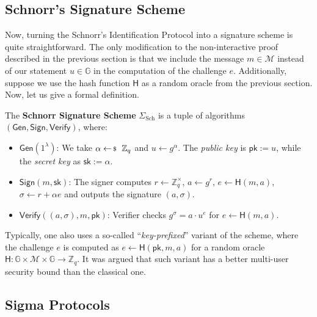 \documentclass[../../book.tex]{subfiles}
\begin{document}
\subsection{Schnorr's Signature Scheme}

Now, turning the Schnorr's Identification Protocol into a signature scheme is quite straightforward. The only modification to the non-interactive proof described in the previous section is that we include the message $m \in \mathcal{M}$ instead of our statement $u \in \mathbb{G}$ in the computation of the challenge $e$. Additionally, suppose we use the hash function $\mathsf{H}$ as a random oracle from the previous section. Now, let us give a formal definition.

\begin{definition}
    The \textbf{Schnorr Signature Scheme} $\Sigma_{\text{Sch}}$ \cite{schnorr1989} is a tuple of algorithms $(\mathsf{Gen}, \mathsf{Sign}, \mathsf{Verify})$, where:
    \begin{itemize}
        \item $\mathsf{Gen}(1^{\lambda})$: We take $\alpha \leftarrowS \mathbb{Z}_q$ and $u \gets g^{\alpha}$. The \textit{public key} is $\mathsf{pk} := u$, while the \textit{secret key} as $\mathsf{sk} := \alpha$.
        \item $\mathsf{Sign}(m,\mathsf{sk})$: The signer computes $r \gets \mathbb{Z}_q^{\times}$, $a \gets g^{r}$, $e \gets \mathsf{H}(m, a)$, $\sigma \gets r + \alpha e$ and outputs the signature $(a,\sigma)$.
        \item $\mathsf{Verify}((a, \sigma), m,\mathsf{pk})$: Verifier checks $g^{\sigma} = a \cdot u^e$ for $e \gets \mathsf{H}(m, a)$.
    \end{itemize}
\end{definition}

\begin{remark}
    Typically, one also uses a so-called ``\textit{key-prefixed}'' variant of the scheme, where the challenge $e$ is computed as $e \gets \mathsf{H}(\mathsf{pk}, m, a)$ for a random oracle $\mathsf{H}: \mathbb{G} \times \mathcal{M} \times \mathbb{G} \to \mathbb{Z}_q$. It was argued that such variant has a better multi-user security bound than the classical one.
\end{remark}

\subsection{Sigma Protocols}
\end{document}
